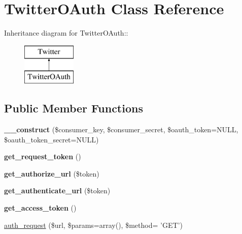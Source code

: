 \hypertarget{classTwitterOAuth}{
\section{TwitterOAuth Class Reference}
\label{classTwitterOAuth}
}
Inheritance diagram for TwitterOAuth::\begin{figure}[H]
\begin{center}
\leavevmode
\includegraphics[height=2cm]{classTwitterOAuth}
\end{center}
\end{figure}
\subsection*{Public Member Functions}
\begin{CompactItemize}
\item 
\hypertarget{classTwitterOAuth_712ea14074930f75fff938ce65f87e99}{
\textbf{\_\-\_\-construct} (\$consumer\_\-key, \$consumer\_\-secret, \$oauth\_\-token=NULL, \$oauth\_\-token\_\-secret=NULL)}
\label{classTwitterOAuth_712ea14074930f75fff938ce65f87e99}

\item 
\hypertarget{classTwitterOAuth_0da2215f0076abe69526740f583659bd}{
\textbf{get\_\-request\_\-token} ()}
\label{classTwitterOAuth_0da2215f0076abe69526740f583659bd}

\item 
\hypertarget{classTwitterOAuth_7e4bcbdd08585845e1a56bbcfd8aa335}{
\textbf{get\_\-authorize\_\-url} (\$token)}
\label{classTwitterOAuth_7e4bcbdd08585845e1a56bbcfd8aa335}

\item 
\hypertarget{classTwitterOAuth_bc14fea626c993a0eee4aad5dc3a5c11}{
\textbf{get\_\-authenticate\_\-url} (\$token)}
\label{classTwitterOAuth_bc14fea626c993a0eee4aad5dc3a5c11}

\item 
\hypertarget{classTwitterOAuth_020d6ae524b8086726d6baf721d0184a}{
\textbf{get\_\-access\_\-token} ()}
\label{classTwitterOAuth_020d6ae524b8086726d6baf721d0184a}

\item 
\hyperlink{classTwitterOAuth_186e14f18c9097450c53892405600b86}{auth\_\-request} (\$url, \$params=array(), \$method= 'GET')
\end{CompactItemize}
